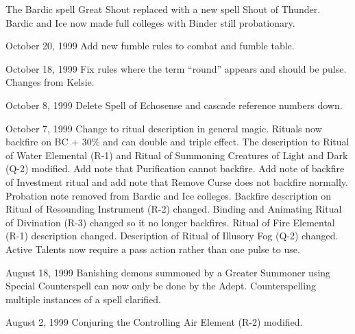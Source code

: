 \begin{edition}{1.3}
The Bardic spell Great Shout replaced with a new spell Shout of Thunder.
Bardic and Ice now made full colleges with Binder still probationary.


\item[October 20, 1999] Add new fumble rules to combat and fumble table.

\item[October 18, 1999] Fix rules where the term ``round'' appears and
should be pulse.  Changes from Kelsie.

\item[October 8, 1999] Delete Spell of Echosense and cascade reference
numbers down.

\item[October 7, 1999] Change to ritual description in general magic.
Rituals now backfire on BC + 30\% and can double and triple effect.
The description to Ritual of Water Elemental (R-1) and Ritual of
Summoning Creatures of Light and Dark (Q-2) modified.  Add note that
Purification cannot backfire.  Add note of backfire of Investment
ritual and add note that Remove Curse does not backfire normally.
Probation note removed from Bardic and Ice colleges.  Backfire
description on Ritual of Resounding Instrument (R-2) changed.  Binding
and Animating Ritual of Divination (R-3) changed so it no longer
backfires.  Ritual of Fire Elemental (R-1) description changed.
Description of Ritual of Illusory Fog (Q-2) changed.  Active Talents
now require a pass action rather than one pulse to use.

\item[August 18, 1999] Banishing demons summoned by a Greater Summoner
using Special Counterspell can now only be done by the Adept.
Counterspelling multiple instances of a spell clarified.

\item[August 2, 1999] Conjuring the Controlling Air Element (R-2)
modified.
\end{edition}

